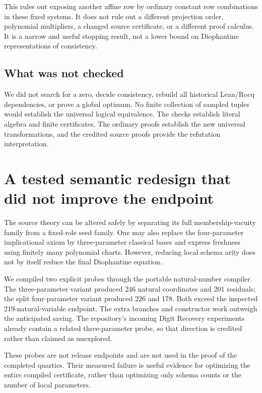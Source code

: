 \documentclass[11pt]{article}
\theoremstyle{remark}\newtheorem{remark}[theorem]{Remark}
\begin{document}
This rules out exposing another affine row by ordinary constant row
combinations in these fixed systems. It does not rule out a different
projection order, polynomial multipliers, a changed source certificate,
or a different proof calculus. It is a narrow and useful stopping result,
not a lower bound on Diophantine representations of consistency.

\subsection{What was not checked}

We did not search for a zero, decide consistency, rebuild all historical
Lean/Rocq dependencies, or prove a global optimum. No finite collection
of sampled tuples would establish the universal logical equivalence.
The checks establish literal algebra and finite certificates. The
ordinary proofs establish the new universal transformations, and the
credited source proofs provide the refutation interpretation.

\section{A tested semantic redesign that did not improve the endpoint}

The source theory can be altered safely by separating its full
membership-vacuity family from a fixed-role seed family. One may also
replace the four-parameter implicational axiom by three-parameter
classical bases and express freshness using finitely many polynomial
charts. However, reducing local schema arity does not by itself
reduce the final Diophantine equation.

We compiled two explicit probes through the portable natural-number
compiler. The three-parameter variant produced 246 natural coordinates
and 201 residuals; the split four-parameter variant produced 226 and 178.
Both exceed the inspected 219-natural-variable endpoint. The extra
branches and constructor work outweigh the anticipated saving.
The repository's incoming Digit Recovery experiments already contain
a related three-parameter probe, so that direction is credited rather
than claimed as unexplored.

These probes are not release endpoints and are not used in the proof of
the completed quartics. Their measured failure is useful evidence for
optimizing the entire compiled certificate, rather than optimizing only
schema counts or the number of local parameters.
\end{document}
